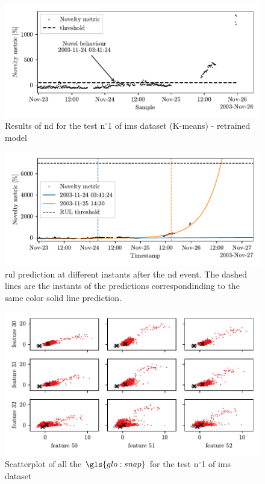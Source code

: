 \begin{figure}
    \centering
    \includegraphics{images/IMS/Novelty_01_500samples_bearing3x_retrained.pdf}
    \caption{Results of \gls{nd} for the test $\text{n}^\circ$1 of \gls{ims} dataset (K-means) - retrained model}
    \label{fig:NoveltyScore_01_retrained}
\end{figure}

\begin{figure}
    \centering
    \includegraphics{images/IMS/Novelty_01_500samples_bearing3x_predictions_retrained.pdf}
    \caption{\gls{rul} prediction at different instants after the \gls{nd} event. The dashed lines are the instants of the predictions correspondinding to the same color solid line prediction.}
    \label{fig:RULPredictions01_retrained}
\end{figure}

\begin{figure}
    \centering
    \includegraphics{images/IMS/Clusters_novelty.pdf}
    \caption{Scatterplot of all the $\gls{glo:snap}$ for the test $\text{n}^\circ$1 of \gls{ims} dataset}
    \label{fig:Clusters_novelty}
\end{figure}

